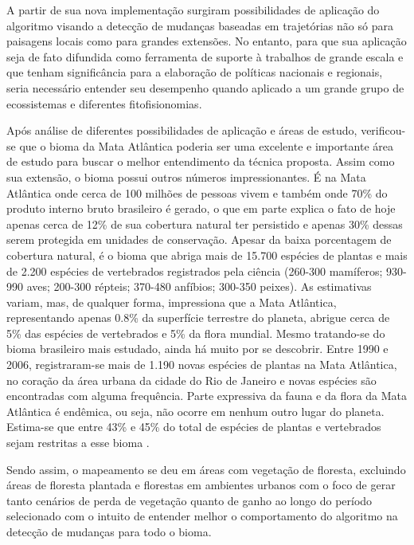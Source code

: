 \documentclass[12pt,a4paper]{article}
\begin{document}
A partir de sua nova implementação surgiram possibilidades de aplicação do algoritmo visando a detecção de mudanças baseadas em trajetórias não só para paisagens locais como para grandes extensões. No entanto, para que sua aplicação seja de fato difundida como ferramenta de suporte à trabalhos de grande escala e que tenham significância para a elaboração de políticas nacionais e regionais, seria necessário entender seu desempenho quando aplicado a um grande grupo de ecossistemas e diferentes fitofisionomias.

Após análise de diferentes possibilidades de aplicação e áreas de estudo, verificou-se que o bioma da Mata Atlântica poderia ser uma excelente e importante área de estudo para buscar o melhor entendimento da técnica proposta. Assim como sua extensão, o bioma possui outros números impressionantes. É na Mata Atlântica onde cerca de 100 milhões de pessoas vivem e também onde 70\% do produto interno bruto brasileiro é gerado, o que em parte explica o fato de hoje apenas cerca de 12\% de sua cobertura natural ter persistido e apenas 30\% dessas serem protegida em unidades de conservação. Apesar da baixa porcentagem de cobertura natural, é o bioma que abriga mais de 15.700 espécies de plantas e mais de 2.200 espécies de vertebrados registrados pela ciência (260-300 mamíferos; 930-990 aves; 200-300 répteis; 370-480 anfíbios; 300-350 peixes). As estimativas variam, mas, de qualquer forma, impressiona que a Mata Atlântica, representando apenas 0.8\% da superfície terrestre do planeta, abrigue cerca de 5\% das espécies de vertebrados e 5\% da flora mundial. Mesmo tratando-se do bioma brasileiro mais estudado, ainda há muito por se descobrir. Entre 1990 e 2006, registraram-se mais de 1.190 novas espécies de plantas na Mata Atlântica, no coração da área urbana da cidade do Rio de Janeiro e novas espécies são encontradas com alguma frequência. Parte expressiva da fauna e da flora da Mata Atlântica é endêmica, ou seja, não ocorre em nenhum outro lugar do planeta. Estima-se que entre 43\% e 45\% do total de espécies de plantas e vertebrados sejam restritas a esse bioma \citep{scarano2014}.

Sendo assim, o mapeamento se deu em áreas com vegetação de floresta, excluindo áreas de floresta plantada e florestas em ambientes urbanos com o foco de gerar tanto cenários de perda de vegetação quanto de ganho ao longo do período selecionado com o intuito de entender melhor o comportamento do algoritmo na detecção de mudanças para todo o bioma. 
\end{document}

